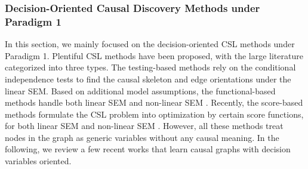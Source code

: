 
 

\subsubsection{Decision-Oriented Causal Discovery Methods under Paradigm 1}\label{sec:learn_dag}

 In this section, we mainly focused on the decision-oriented \acrshort{CSL} methods under Paradigm 1. Plentiful \acrshort{CSL} methods have been proposed, with the large literature categorized into three types. 
The testing-based methods \citep[e.g.,][for the well-known PC algorithm]{spirtes2000constructing} rely on the conditional independence tests to find the causal skeleton and edge orientations under the linear \acrshort{SEM}. Based on additional model assumptions, the functional-based methods handle both linear \acrshort{SEM} \citep[e.g.,][]{shimizu2006linear} and non-linear \acrshort{SEM} \citep[e.g.,][]{buhlmann2014cam}. Recently, the score-based methods formulate the \acrshort{CSL} problem into optimization by certain score functions, for both linear \acrshort{SEM} \citep[e.g.,][]{ramsey2017million,zheng2018dags} and non-linear \acrshort{SEM} \citep[e.g.,][]{yu2019dag,zhu2019causal,zheng2020learning,rolland2022score}. However, all these methods treat nodes in the graph as generic variables without any causal meaning. In the following, we review a few recent works that learn causal graphs with decision variables oriented.



